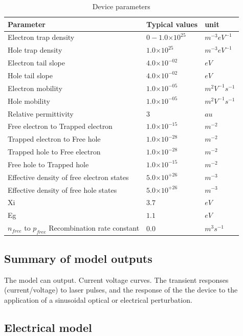 \documentclass[11pt]{article}
\providecommand{\e}[1]{\ensuremath{\times 10^{#1}}}
\begin{document}
\begin{table}[H]
\begin{center}
\begin{tabular}{lll}
\hline
Parameter & Typical values & unit  \\
\hline
Electron trap density & $0-1.0\e{25}$ & $m^{-3} eV^{-1}$ \\
Hole trap density & $1.0\e{25}$ & $m^{-3} eV^{-1}$ \\
Electron tail slope & $4.0\e{-02}$ & $eV$ \\
Hole tail slope & $4.0\e{-02}$ & $eV$ \\
Electron mobility & $1.0\e{-05}$ & $m^{2}V^{-1}s^{-1}$ \\
Hole mobility & $1.0\e{-05}$ & $m^{2}V^{-1}s^{-1}$ \\
Relative permittivity & $3$ & $au$ \\
Free electron to Trapped electron & $1.0\e{-15}$ & $m^{-2}$ \\
Trapped electron to Free hole & $1.0\e{-28}$ & $m^{-2}$ \\
Trapped hole to Free electron & $1.0\e{-28}$ & $m^{-2}$ \\
Free hole to Trapped hole & $1.0\e{-15}$ & $m^{-2}$ \\
Effective density of free electron states & $5.0\e{+26}$ & $m^{-3}$ \\
Effective density of free hole states & $5.0\e{+26}$ & $m^{-3}$ \\
Xi & $3.7$ & $eV$ \\
Eg & $1.1$ & $eV$ \\
$n_{free}$ to $p_{free}$ Recombination rate constant & $0.0$ & $m^{3}s^{-1}$ \\
  \hline
\end{tabular}
\end{center}
\caption{Device parameters}
\end{table}

\subsection{Summary of model outputs}
The model can output.  Current voltage curves.  The transient responses (current/voltage) to laser pulses, and the response of the the device to the application of a sinusoidal optical or electrical perturbation. 

\subsection{Electrical model}
\end{document}
